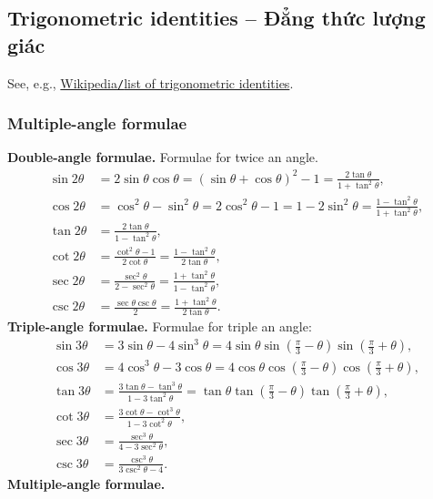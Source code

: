 \documentclass{article}
\begin{document}
\subsection{Trigonometric identities -- Đẳng thức lượng giác}
See, e.g., \href{https://en.wikipedia.org/wiki/List_of_trigonometric_identities}{Wikipedia{\tt/}list of trigonometric identities}.

\subsubsection{Multiple-angle formulae}
{\bf Double-angle formulae.} Formulae for twice an angle.
\begin{align*}
	\sin2\theta &= 2\sin\theta\cos\theta = (\sin\theta + \cos\theta)^2 - 1 = \frac{2\tan\theta}{1 + \tan^2\theta},\\
	\cos2\theta &= \cos^2\theta - \sin^2\theta = 2\cos^2\theta - 1 = 1 - 2\sin^2\theta = \frac{1 - \tan^2\theta}{1 + \tan^2\theta},\\
	\tan2\theta &= \frac{2\tan\theta}{1 - \tan^2\theta},\\
	\cot2\theta &= \frac{\cot^2\theta - 1}{2\cot\theta} = \frac{1 - \tan^2\theta}{2\tan\theta},\\
	\sec2\theta &= \frac{\sec^2\theta}{2 - \sec^2\theta} = \frac{1 + \tan^2\theta}{1 - \tan^2\theta},\\
	\csc2\theta &= \frac{\sec\theta\csc\theta}{2} = \frac{1 + \tan^2\theta}{2\tan\theta}.
\end{align*}
{\bf Triple-angle formulae.} Formulae for triple an angle:
\begin{align*}
	\sin3\theta &= 3\sin\theta - 4\sin^3\theta = 4\sin\theta\sin\left(\frac{\pi}{3} - \theta\right)\sin\left(\frac{\pi}{3} + \theta\right),\\
	\cos3\theta &= 4\cos^3\theta - 3\cos\theta = 4\cos\theta\cos\left(\frac{\pi}{3} - \theta\right)\cos\left(\frac{\pi}{3} + \theta\right),\\
	\tan3\theta &= \frac{3\tan\theta - \tan^3\theta}{1 - 3\tan^2\theta} = \tan\theta\tan\left(\frac{\pi}{3} - \theta\right)\tan\left(\frac{\pi}{3} + \theta\right),\\
	\cot3\theta &= \frac{3\cot\theta - \cot^3\theta}{1 - 3\cot^2\theta},\\
	\sec3\theta &= \frac{\sec^3\theta}{4 - 3\sec^2\theta},\\
	\csc3\theta &= \frac{\csc^3\theta}{3\csc^2\theta - 4}.
\end{align*}
{\bf Multiple-angle formulae.}
\end{document}
